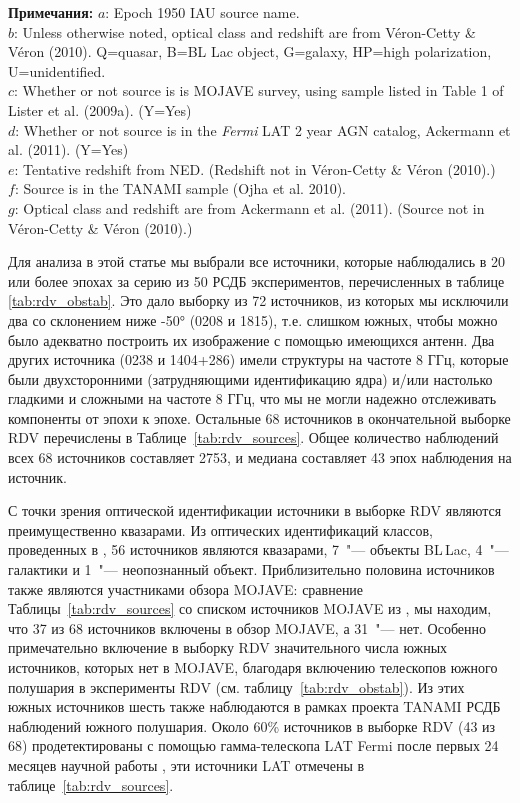 \begin{table}
\textbf{Примечания:}
$a$: Epoch 1950 IAU source name.\\
$b$: Unless otherwise noted, optical class and redshift are from V\'{e}ron-Cetty \& V\'{e}ron
(2010).
Q=quasar, B=BL Lac object, G=galaxy, HP=high polarization, U=unidentified.\\
$c$: Whether or not source is is MOJAVE survey, using sample
listed in Table 1 of Lister et al. (2009a). (Y=Yes)\\
$d$: Whether or not source is in the {\em Fermi} LAT 2 year AGN catalog, Ackermann et al. (2011).
(Y=Yes)\\
$e$: Tentative redshift from NED. (Redshift not in V\'{e}ron-Cetty \& V\'{e}ron (2010).)\\
$f$: Source is in the TANAMI sample (Ojha et al. 2010).\\
$g$: Optical class and redshift are from Ackermann et al. (2011). (Source not in V\'{e}ron-Cetty \&
V\'{e}ron (2010).)\\
\end{table}

Для анализа в этой статье мы выбрали все источники, которые наблюдались в 20 или более эпохах за
серию из 50 РСДБ экспериментов, перечисленных в таблице \ref{tab:rdv_obstab}. Это дало выборку из 72
источников, из которых мы исключили два со склонением ниже \ang{-50} (0208 и
1815), т.\:е. слишком южных, чтобы можно было адекватно построить их изображение с
помощью имеющихся антенн. Два других источника (0238 и 1404+286) имели структуры на
частоте 8 ГГц, которые были двухсторонними (затрудняющими идентификацию ядра) и/или настолько
гладкими и сложными на частоте 8 ГГц, что мы не могли надежно отслеживать компоненты от эпохи к
эпохе. Остальные 68 источников в окончательной выборке RDV перечислены в
Таблице~\ref{tab:rdv_sources}. Общее количество наблюдений всех 68 источников составляет 2753, и
медиана составляет 43 эпох наблюдения на источник.

С точки зрения оптической идентификации источники в выборке RDV являются преимущественно квазарами.
Из оптических идентификаций классов, проведенных в \cite{Veron_2010}, 56 источников являются
квазарами, 7~"--- объекты BL\,Lac, 4~"--- галактики и 1~"--- неопознанный объект. Приблизительно
половина источников также являются участниками обзора MOJAVE: сравнение
Таблицы~\ref{tab:rdv_sources} со списком источников MOJAVE из \cite{Lister_2009a}, мы находим, что
37 из 68 источников включены в обзор MOJAVE, а 31~"--- нет. Особенно примечательно включение в
выборку RDV значительного числа южных источников, которых нет в MOJAVE, благодаря включению
телескопов южного полушария в эксперименты RDV (см. таблицу~\ref{tab:rdv_obstab}). Из этих южных
источников шесть также наблюдаются в рамках проекта TANAMI \cite{Ojha_2010} РСДБ наблюдений южного
полушария. Около 60\% источников в выборке RDV (43 из 68) продетектированы с помощью гамма-телескопа
LAT Fermi после первых 24 месяцев научной работы \cite{Ackermann_2011}, эти источники LAT отмечены в
таблице~\ref{tab:rdv_sources}.

